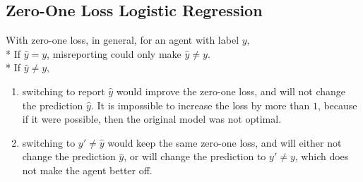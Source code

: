 \documentclass{article}
\begin{document}
\subsection{Zero-One Loss Logistic Regression}
With zero-one loss, in general, for an agent with label $y, $
\\* If $\hat{y} = y $, misreporting could only make $\hat{y} \neq  y$.
\\* If $\hat{y} \neq  y, $
\begin{enumerate}
\item switching to report $\hat{y}$ would improve the zero-one loss, and will not change the prediction $\hat{y}$. It is impossible to increase the loss by more than $1$, because if it were possible, then the original model was not optimal.
\item switching to $y' \neq  \hat{y}$ would keep the same zero-one loss, and will either not change the prediction $\hat{y}$, or will change the prediction to $y' \neq  y $, which does not make the agent better off.
\end{enumerate}
\end{document}
